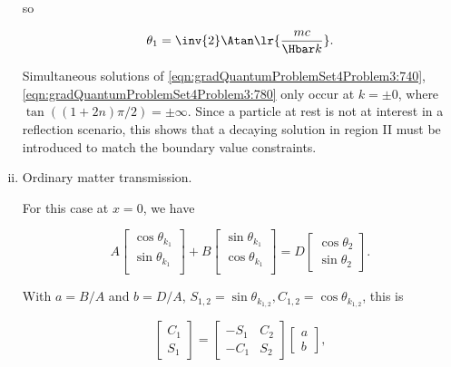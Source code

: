 \begin{enumerate}[(i)]
so

\begin{dmath}\label{eqn:gradQuantumProblemSet4Problem3:780}
\theta_1 = \inv{2} \Atan\lr{ \frac{m c}{\Hbar k} }.
\end{dmath}

Simultaneous solutions of \cref{eqn:gradQuantumProblemSet4Problem3:740}, \cref{eqn:gradQuantumProblemSet4Problem3:780} only occur at \( k = \pm 0 \), where \( \tan( (1 + 2 n)\pi/2 ) = \pm \infty \).  Since a particle at rest is not at interest in a reflection scenario, this shows that a decaying solution in region II must be introduced to match the boundary value constraints.

\item Ordinary matter transmission.

For this case at \( x = 0 \), we have

\begin{dmath}\label{eqn:gradQuantumProblemSet4Problem3:920}
A
\begin{bmatrix}
\cos\theta_{k_1} \\
\sin\theta_{k_1} \\
\end{bmatrix}
+
B
\begin{bmatrix}
\sin\theta_{k_1} \\
\cos\theta_{k_1} \\
\end{bmatrix}
=
D
\begin{bmatrix}
\cos \theta_2 \\
\sin \theta_2
\end{bmatrix}.
\end{dmath}

With \( a = B/A \) and \( b = D/A \), \( S_{1,2} = \sin\theta_{k_{1,2}}, C_{1,2} = \cos\theta_{k_{1,2}} \), this is

\begin{dmath}\label{eqn:gradQuantumProblemSet4Problem3:800}
\begin{bmatrix}
C_1 \\
S_1
\end{bmatrix}
=
\begin{bmatrix}
- S_1 & C_2 \\
- C_1 & S_2
\end{bmatrix}
\begin{bmatrix}
a \\
b
\end{bmatrix},
\end{dmath}


\end{enumerate}
